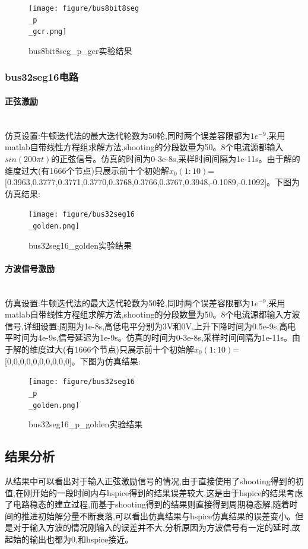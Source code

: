 \documentclass[12pt]{article}
\newcommand{\subsubsubsection}[1]{\paragraph{#1}\mbox{}\\}
\begin{document}
\begin{sloppypar}
\begin{figure}[H]
  \centering
  \texttt{[image: figure/bus8bit8seg\\\_p\\\_gcr.png]}
  \caption{bus8bit8seg\_p\_gcr实验结果}
\end{figure}

\subsubsection{bus32seg16电路}
\subsubsubsection{正弦激励}

\qquad 仿真设置:牛顿迭代法的最大迭代轮数为50轮,同时两个误差容限都为$1e^{-9}$,采用matlab自带线性方程组求解方法,shooting的分段数量为50。8个电流源都输入$sin(200\pi t)$的正弦信号。仿真的时间为0-3e-8s,采样时间间隔为1e-11s。由于解的维度过大(有1666个节点)只展示前十个初始解$x_0(1:10)$=[0.3963,0.3777,0.3771,0.3770,0.3768,0.3766,0.3767,0.3948,-0.1089,-0.1092]。下图为仿真结果:

\begin{figure}[H]
  \centering
  \texttt{[image: figure/bus32seg16\\\_golden.png]}
  \caption{bus32seg16\_golden实验结果}
\end{figure}


\subsubsubsection{方波信号激励}

\qquad 仿真设置:牛顿迭代法的最大迭代轮数为50轮,同时两个误差容限都为$1e^{-9}$,采用matlab自带线性方程组求解方法,shooting的分段数量为50。8个电流源都输入方波信号,详细设置:周期为1e-8s,高低电平分别为3V和0V,上升下降时间为0.5e-9s,高电平时间为4e-9s,信号延迟为1e-9s。仿真的时间为0-3e-8s,采样时间间隔为1e-11s。由于解的维度过大(有1666个节点)只展示前十个初始解$x_0(1:10)$=[0,0,0,0,0,0,0,0,0,0]。下图为仿真结果:

\begin{figure}[H]
  \centering
  \texttt{[image: figure/bus32seg16\\\_p\\\_golden.png]}
  \caption{bus32seg16\_p\_golden实验结果}
\end{figure}

\subsection{结果分析}

\qquad 从结果中可以看出对于输入正弦激励信号的情况,由于直接使用了shooting得到的初值,在刚开始的一段时间内与hspice得到的结果误差较大,这是由于hspice的结果考虑了电路稳态的建立过程,而基于shooting得到的结果则直接得到周期稳态解,随着时间的推进初始解分量不断衰落,可以看出仿真结果与hspice仿真结果的误差变小。但是对于输入方波的情况刚输入的误差并不大,分析原因为方波信号有一定的延时,故起始的输出也都为0,和hspice接近。


\end{sloppypar}
\end{document}
